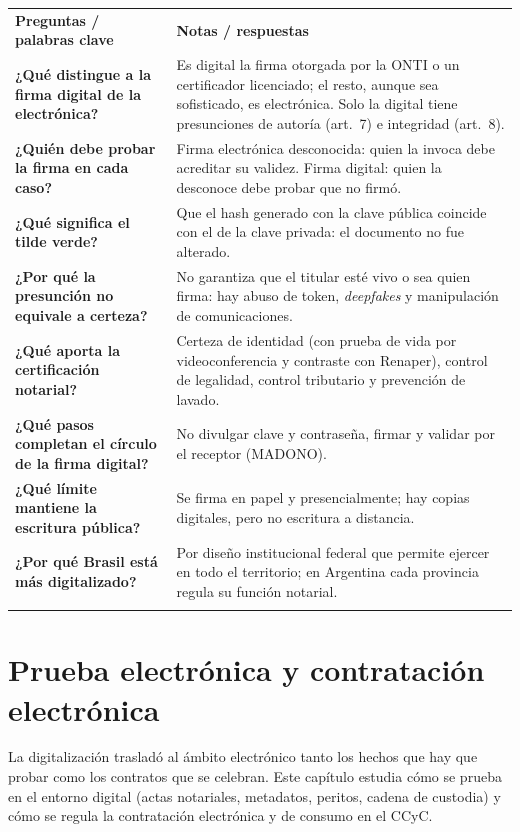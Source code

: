 \documentclass[12pt,oneside]{book}
\newcommand{\cq}[1]{\textbf{#1}}
\newcommand{\cornell}[3]{%
  \par\medskip\noindent\begingroup
  \renewcommand{\arraystretch}{1.25}%
  \begin{tabularx}{\textwidth}{|>{\raggedright\arraybackslash}p{0.27\textwidth}|>{\raggedright\arraybackslash}X|}
    \hline
    \multicolumn{2}{|>{\centering\arraybackslash}X|}{\cellcolor{azulacad!12}\textbf{Cuadro Cornell --- #1}}\\ \hline
    \cellcolor{gray!10}\textbf{Preguntas / palabras clave} & \cellcolor{gray!10}\textbf{Notas / respuestas} \\ \hline
    #2
    \multicolumn{2}{|>{\raggedright\arraybackslash}X|}{\cellcolor{azulacad!6}\textbf{Resumen.} #3}\\ \hline
  \end{tabularx}%
  \endgroup\par\medskip}
\begin{document}
\cornell{Firma electrónica, firma digital y rol del escribano}{
\cq{¿Qué distingue a la firma digital de la electrónica?} & Es digital la firma otorgada por la ONTI o un certificador licenciado; el resto, aunque sea sofisticado, es electrónica. Solo la digital tiene presunciones de autoría (art.~7) e integridad (art.~8). \\ \hline
\cq{¿Quién debe probar la firma en cada caso?} & Firma electrónica desconocida: quien la invoca debe acreditar su validez. Firma digital: quien la desconoce debe probar que no firmó. \\ \hline
\cq{¿Qué significa el tilde verde?} & Que el hash generado con la clave pública coincide con el de la clave privada: el documento no fue alterado. \\ \hline
\cq{¿Por qué la presunción no equivale a certeza?} & No garantiza que el titular esté vivo o sea quien firma: hay abuso de token, \emph{deepfakes} y manipulación de comunicaciones. \\ \hline
\cq{¿Qué aporta la certificación notarial?} & Certeza de identidad (con prueba de vida por videoconferencia y contraste con Renaper), control de legalidad, control tributario y prevención de lavado. \\ \hline
\cq{¿Qué pasos completan el círculo de la firma digital?} & No divulgar clave y contraseña, firmar y validar por el receptor (MADONO). \\ \hline
\cq{¿Qué límite mantiene la escritura pública?} & Se firma en papel y presencialmente; hay copias digitales, pero no escritura a distancia. \\ \hline
\cq{¿Por qué Brasil está más digitalizado?} & Por diseño institucional federal que permite ejercer en todo el territorio; en Argentina cada provincia regula su función notarial. \\ \hline
}{La firma electrónica y la digital difieren en presunciones y carga de la prueba; la certificación notarial agrega certeza de identidad y controles que ninguna plataforma privada ofrece. La infraestructura (token, validación, plataformas del Colegio) convive con riesgos de identidad y con límites jurisdiccionales y de soporte.}

\chapter{Prueba electrónica y contratación electrónica}
\label{cap:prueba}

La digitalización trasladó al ámbito electrónico tanto los hechos que hay que probar como los contratos que se celebran. Este capítulo estudia cómo se prueba en el entorno digital (actas notariales, metadatos, peritos, cadena de custodia) y cómo se regula la contratación electrónica y de consumo en el CCyC.
\end{document}
